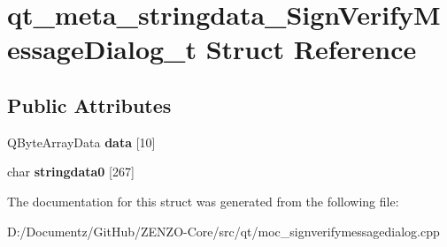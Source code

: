 \hypertarget{structqt__meta__stringdata___sign_verify_message_dialog__t}{}\section{qt\+\_\+meta\+\_\+stringdata\+\_\+\+Sign\+Verify\+Message\+Dialog\+\_\+t Struct Reference}
\label{structqt__meta__stringdata___sign_verify_message_dialog__t}
\subsection*{Public Attributes}
\begin{DoxyCompactItemize}
\item 
\mbox{\label{structqt__meta__stringdata___sign_verify_message_dialog__t_aaa3c4b41566ff03ab73b3cd011667744}} 
Q\+Byte\+Array\+Data {\bfseries data} \mbox{[}10\mbox{]}
\item 
\mbox{\label{structqt__meta__stringdata___sign_verify_message_dialog__t_afa87a7f2e47e11362138b0a7fd71a897}} 
char {\bfseries stringdata0} \mbox{[}267\mbox{]}
\end{DoxyCompactItemize}


The documentation for this struct was generated from the following file\+:\begin{DoxyCompactItemize}
\item 
D\+:/\+Documentz/\+Git\+Hub/\+Z\+E\+N\+Z\+O-\/\+Core/src/qt/moc\+\_\+signverifymessagedialog.\+cpp\end{DoxyCompactItemize}
